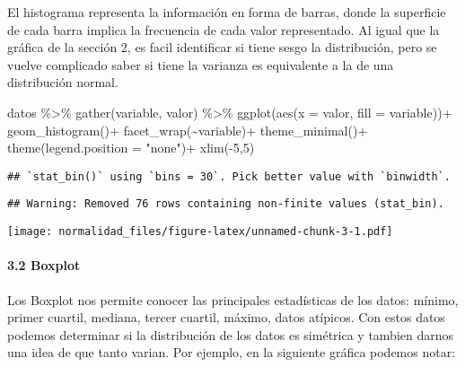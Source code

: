 \documentclass[
]{article}
\newenvironment{Shaded}{\begin{snugshade}}{\end{snugshade}}
\newcommand{\AttributeTok}[1]{\textcolor[rgb]{0.77,0.63,0.00}{#1}}
\newcommand{\DecValTok}[1]{\textcolor[rgb]{0.00,0.00,0.81}{#1}}
\newcommand{\FunctionTok}[1]{\textcolor[rgb]{0.00,0.00,0.00}{#1}}
\newcommand{\NormalTok}[1]{#1}
\newcommand{\SpecialCharTok}[1]{\textcolor[rgb]{0.00,0.00,0.00}{#1}}
\newcommand{\StringTok}[1]{\textcolor[rgb]{0.31,0.60,0.02}{#1}}
\begin{document}
El histograma representa la información en forma de barras, donde la
superficie de cada barra implica la frecuencia de cada valor
representado. Al igual que la gráfica de la sección 2, es facil
identificar si tiene sesgo la distribución, pero se vuelve complicado
saber si tiene la varianza es equivalente a la de una distribución
normal.

\begin{Shaded}
\begin{Highlighting}[]
\NormalTok{datos }\SpecialCharTok{\%\textgreater{}\%} 
  \FunctionTok{gather}\NormalTok{(variable, valor) }\SpecialCharTok{\%\textgreater{}\%} 
  \FunctionTok{ggplot}\NormalTok{(}\FunctionTok{aes}\NormalTok{(}\AttributeTok{x =}\NormalTok{ valor, }\AttributeTok{fill =}\NormalTok{ variable))}\SpecialCharTok{+}
  \FunctionTok{geom\_histogram}\NormalTok{()}\SpecialCharTok{+}
  \FunctionTok{facet\_wrap}\NormalTok{(}\SpecialCharTok{\textasciitilde{}}\NormalTok{variable)}\SpecialCharTok{+}
  \FunctionTok{theme\_minimal}\NormalTok{()}\SpecialCharTok{+}
  \FunctionTok{theme}\NormalTok{(}\AttributeTok{legend.position =} \StringTok{"none"}\NormalTok{)}\SpecialCharTok{+}
  \FunctionTok{xlim}\NormalTok{(}\SpecialCharTok{{-}}\DecValTok{5}\NormalTok{,}\DecValTok{5}\NormalTok{)}
\end{Highlighting}
\end{Shaded}

\begin{verbatim}
## `stat_bin()` using `bins = 30`. Pick better value with `binwidth`.
\end{verbatim}

\begin{verbatim}
## Warning: Removed 76 rows containing non-finite values (stat_bin).
\end{verbatim}

\texttt{[image: normalidad\_files/figure-latex/unnamed-chunk-3-1.pdf]}

\hypertarget{boxplot}{%
\paragraph{3.2 Boxplot}\label{boxplot}}

Los Boxplot nos permite conocer las principales estadísticas de los
datos: mínimo, primer cuartil, mediana, tercer cuartil, máximo, datos
atípicos. Con estos datos podemos determinar si la distribución de los
datos es simétrica y tambien darnos una idea de que tanto varian. Por
ejemplo, en la siguiente gráfica podemos notar:
\end{document}
